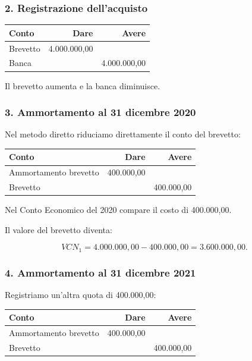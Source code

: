 \subsubsection*{2. Registrazione dell'acquisto}

\begin{center}
    \begin{tabular}{|l|r|r|}
        \hline
        \textbf{Conto}
        & \textbf{Dare}
        & \textbf{Avere} \\
        \hline
        Brevetto
        & 4.000.000,00 & \\
        Banca
        & & 4.000.000,00 \\
        \hline
    \end{tabular}
\end{center}

\noindent Il brevetto aumenta
e la banca diminuisce.


\subsubsection*{3. Ammortamento al 31 dicembre 2020}

\noindent Nel metodo diretto
riduciamo direttamente
il conto del brevetto:

\begin{center}
    \begin{tabular}{|l|r|r|}
        \hline
        \textbf{Conto}
        & \textbf{Dare}
        & \textbf{Avere} \\
        \hline
        Ammortamento brevetto
        & 400.000,00 & \\
        Brevetto
        & & 400.000,00 \\
        \hline
    \end{tabular}
\end{center}

\noindent Nel Conto Economico del 2020
compare il costo di 400.000,00.

\noindent Il valore del brevetto diventa:

\[
VCN_1=
4.000.000{,}00-400.000{,}00
=
\boxed{3.600.000{,}00}.
\]


\subsubsection*{4. Ammortamento al 31 dicembre 2021}

\noindent Registriamo un'altra quota
di 400.000,00:

\begin{center}
    \begin{tabular}{|l|r|r|}
        \hline
        \textbf{Conto}
        & \textbf{Dare}
        & \textbf{Avere} \\
        \hline
        Ammortamento brevetto
        & 400.000,00 & \\
        Brevetto
        & & 400.000,00 \\
        \hline
    \end{tabular}
\end{center}

